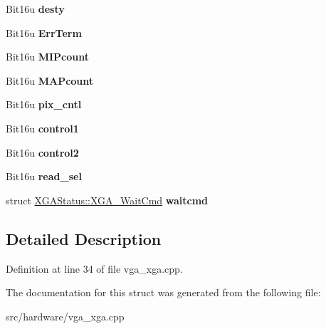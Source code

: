 \begin{DoxyCompactItemize}
\item 
\hypertarget{structXGAStatus_ac5dc4dad194ca137721de8f2ec998840}{Bit16u {\bfseries desty}}\label{structXGAStatus_ac5dc4dad194ca137721de8f2ec998840}

\item 
\hypertarget{structXGAStatus_a4b5b806287287688ab79d541f8577c76}{Bit16u {\bfseries Err\-Term}}\label{structXGAStatus_a4b5b806287287688ab79d541f8577c76}

\item 
\hypertarget{structXGAStatus_a04b27bf7c00e3233dbfe12be21c10f62}{Bit16u {\bfseries M\-I\-Pcount}}\label{structXGAStatus_a04b27bf7c00e3233dbfe12be21c10f62}

\item 
\hypertarget{structXGAStatus_ad51043d7d66c0cad52cf00f7c7aef478}{Bit16u {\bfseries M\-A\-Pcount}}\label{structXGAStatus_ad51043d7d66c0cad52cf00f7c7aef478}

\item 
\hypertarget{structXGAStatus_aa51ddb6d77b1ad209fc334f4928bf7ff}{Bit16u {\bfseries pix\-\_\-cntl}}\label{structXGAStatus_aa51ddb6d77b1ad209fc334f4928bf7ff}

\item 
\hypertarget{structXGAStatus_a7402792967e3bfd08f4ffbe9d6b762ac}{Bit16u {\bfseries control1}}\label{structXGAStatus_a7402792967e3bfd08f4ffbe9d6b762ac}

\item 
\hypertarget{structXGAStatus_a9fd2ea5886ec9ecca525a903e6d90d99}{Bit16u {\bfseries control2}}\label{structXGAStatus_a9fd2ea5886ec9ecca525a903e6d90d99}

\item 
\hypertarget{structXGAStatus_aa5976c76ba8b623fe11a9c49883fc924}{Bit16u {\bfseries read\-\_\-sel}}\label{structXGAStatus_aa5976c76ba8b623fe11a9c49883fc924}

\item 
\hypertarget{structXGAStatus_af0d5c752c4dbe107d20febdda4983a21}{struct \hyperlink{structXGAStatus_1_1XGA__WaitCmd}{X\-G\-A\-Status\-::\-X\-G\-A\-\_\-\-Wait\-Cmd} {\bfseries waitcmd}}\label{structXGAStatus_af0d5c752c4dbe107d20febdda4983a21}

\end{DoxyCompactItemize}


\subsection{Detailed Description}


Definition at line 34 of file vga\-\_\-xga.\-cpp.



The documentation for this struct was generated from the following file\-:\begin{DoxyCompactItemize}
\item 
src/hardware/vga\-\_\-xga.\-cpp\end{DoxyCompactItemize}
